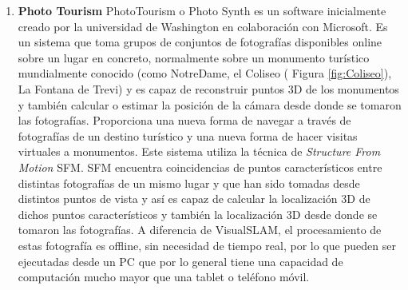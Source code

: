 \begin {enumerate}
\begin{figure}[H]
\begin{center}
\hspace{0.5cm}
\end{center}
\caption{Pix4D cálculo de volumen(a). Cámara multiesprectral Parrot Sequoia (b)}
\end{figure}

\item \textbf{Photo Tourism}
PhotoTourism o Photo Synth es un software inicialmente creado por la universidad de  Washington en colaboración con Microsoft. Es un sistema que toma grupos de conjuntos de fotografías disponibles online sobre un lugar en concreto, normalmente sobre un monumento turístico mundialmente conocido (como NotreDame, el Coliseo ( Figura \ref{fig:Coliseo}), La Fontana de Trevi) y es capaz de reconstruir puntos 3D de los monumentos y también calcular o estimar la posición de la cámara desde donde se tomaron las fotografías. Proporciona una nueva forma de navegar a través de fotografías de un destino turístico y una nueva forma de hacer visitas virtuales a monumentos.
Este sistema utiliza la técnica de \textit {Structure From Motion} SFM. SFM encuentra coincidencias de  puntos característicos entre distintas fotografías de un mismo lugar y que han sido tomadas desde distintos puntos de vista y así es capaz de calcular la localización 3D de dichos puntos característicos y también la localización 3D desde donde se tomaron las fotografías.
A diferencia de VisualSLAM, el procesamiento de estas fotografía es offline, sin necesidad de tiempo real, por lo que pueden ser ejecutadas desde un PC que por lo general tiene una capacidad de computación mucho mayor que una tablet o teléfono móvil.


\end{enumerate}
